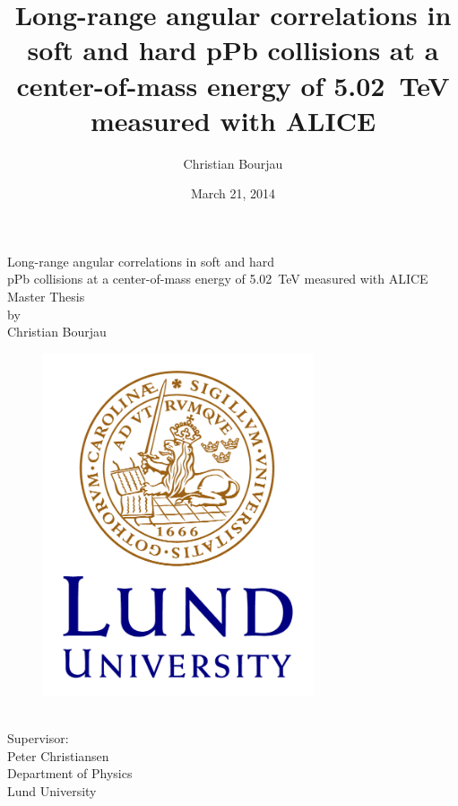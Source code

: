 \documentclass[11pt,a4paper,twoside]{book}
\title{Long-range angular correlations in soft and hard pPb collisions at a center-of-mass energy of \SI{5.02}{TeV} measured with ALICE}
\author{Christian Bourjau}
\date{March 21, 2014}
\begin{document}
\makeatletter
\begin{titlepage}
\frontmatter
\begin{center}
\LARGE{Long-range angular correlations in soft and hard \\
pPb collisions at a center-of-mass energy of \SI{5.02}{TeV} measured with ALICE}
\\[1cm]
\large{Master Thesis\\by\\Christian Bourjau}\\[1cm]
\begin{figure}[h]
\centering
\includegraphics[width=8cm]{./figures/LundUniversity_C2line_RGB.png}\\[1cm]
\end{figure}

\large{\@date \\[3.0ex]Supervisor: \\ Peter Christiansen \\[1.5ex] Department of Physics\\ Lund University}

\end{center}
\end{titlepage}


\newpage
\thispagestyle{empty}


\newpage



\cleardoublepage
\tableofcontents
\newpage
\thispagestyle{empty}
\listoffigures
\newpage
\thispagestyle{empty}
\end{document}
